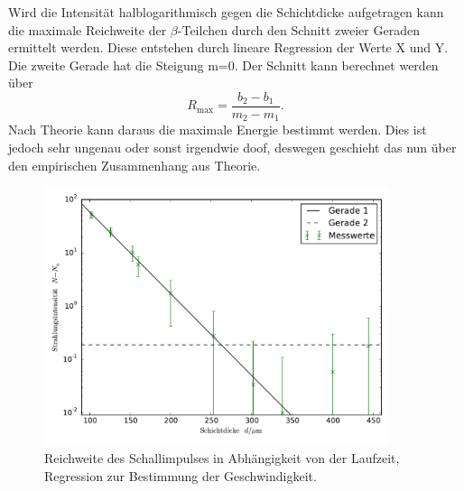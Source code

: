  Wird die Intensität halblogarithmisch gegen die Schichtdicke aufgetragen kann die maximale Reichweite der $\beta$-Teilchen durch den Schnitt zweier Geraden ermittelt werden. Diese entstehen durch lineare Regression der Werte X und Y. Die zweite Gerade hat die Steigung m=0.
Der Schnitt kann berechnet werden über 
\begin{equation}
R_\mathup{max}=\frac{b_2-b_1}{m_2-m_1}.
\end{equation}
Nach Theorie kann daraus die maximale Energie bestimmt werden. Dies ist jedoch sehr ungenau oder sonst irgendwie doof, deswegen geschieht das nun über den empirischen Zusammenhang aus Theorie.
\begin{figure}
	\centering
	\includegraphics[width=0.9\textwidth]{Bilder/beta.pdf}
	\caption{Reichweite des Schallimpulses in Abhängigkeit von der Laufzeit, Regression zur Bestimmung der Geschwindigkeit.}
	\label{fig:geschwindigkeit}
\end{figure}


